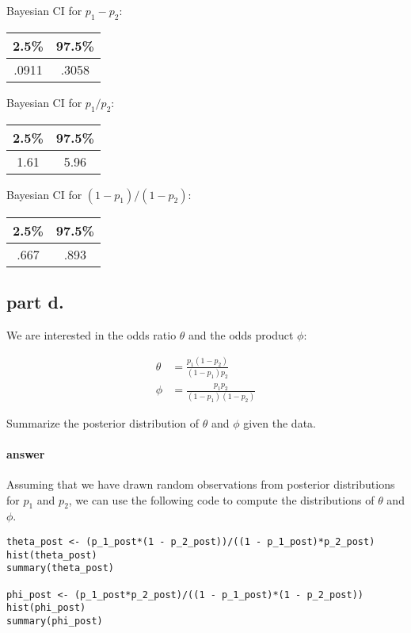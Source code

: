 \documentclass[12pt,a4paper]{article}
\begin{document}
\begin{center}
	Bayesian CI for $p_1 - p_2$:

	\begin{tabular}{|| c | c ||}
		2.5\% & 97.5\% \\
		\hline
		.0911 & .3058
	\end{tabular}
	\vspace{.5cm}

	Bayesian CI for $p_1/p_2$:

	\begin{tabular}{|| c | c ||}
		2.5\% & 97.5\% \\
		\hline
		1.61 & 5.96 	
	\end{tabular}
	\vspace{.5cm}

	Bayesian CI for $(1 - p_1)/(1-p_2)$:

	\begin{tabular}{|| c | c ||}
		2.5\% & 97.5\% \\
		\hline
		.667 & .893
	\end{tabular}
	\vspace{.5cm}
\end{center}


\subsection{part d.}
We are interested in the odds ratio $\theta$ and the odds product $\phi$:

\begin{align*}
	\theta &= \frac{p_1(1-p_2)}{(1 - p_1)p_2} \\
	\phi &= \frac{p_1 p_2}{(1 - p_1) (1-p_2)}
\end{align*}

Summarize the posterior distribution of $\theta$ and $\phi$ given the data.

\paragraph{answer}
Assuming that we have drawn random observations from posterior distributions for $p_1$ and $p_2$, we can use the following code to compute the distributions of $\theta$ and $\phi$.

\begin{lstlisting}
theta_post <- (p_1_post*(1 - p_2_post))/((1 - p_1_post)*p_2_post)
hist(theta_post)
summary(theta_post)

phi_post <- (p_1_post*p_2_post)/((1 - p_1_post)*(1 - p_2_post))
hist(phi_post)
summary(phi_post)
\end{lstlisting}
\end{document}
